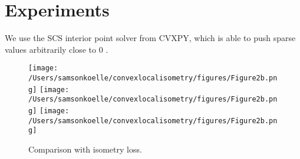 \section{Experiments}
\label{sec:experiments}

We use the SCS interior point solver from CVXPY, which is able to push sparse values arbitrarily close to 0 \cite{cvxpy_sparse_solution}.


\begin{figure}
\centering
{}
{\texttt{[image: /Users/samsonkoelle/convexlocalisometry/figures/Figure2b.png]}}
{\texttt{[image: /Users/samsonkoelle/convexlocalisometry/figures/Figure2b.png]}}
{\texttt{[image: /Users/samsonkoelle/convexlocalisometry/figures/Figure2b.png]}}
\caption{Comparison with isometry loss.}
\label{fig:boxplots}
\end{figure}
